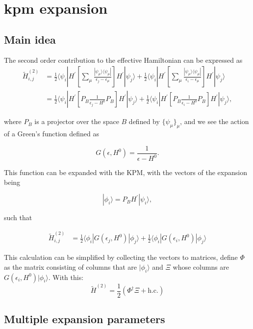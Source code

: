 \documentclass[10pt, onecolumn, aps, prb, superscriptaddress, floatfix, showpacs, notitlepage]{revtex4-1}
\newcommand{\bra}[1]{\langle #1|}
\newcommand{\ket}[1]{|#1\rangle}
\begin{document}
\section{kpm expansion}

\subsection{Main idea}

The second order contribution to the effective Hamiltonian can be expressed as
\begin{align}
\tilde{H}^{(2)}_{i,j} &= \frac{1}{2}
\bra{\psi_i} H^{\prime}
\left[
\sum_\mu
\frac{\ket{\psi_\mu} \bra{\psi_\mu}}{\epsilon_j-\epsilon_\mu}
\right]
H^{\prime} \ket{\psi_j}
+
\frac{1}{2}
\bra{\psi_i} H^{\prime}
\left[
\sum_\mu
\frac{\ket{\psi_\mu} \bra{\psi_\mu}}{\epsilon_i-\epsilon_\mu}
\right]
H^{\prime} \ket{\psi_j}
\\
&= \frac{1}{2}
\bra{\psi_i} H^{\prime}
\left[P_B
\frac{1}{\epsilon_j-H^0}
P_B\right]
H^{\prime} \ket{\psi_j}
+
\frac{1}{2}
\bra{\psi_i} H^{\prime}
\left[P_B
\frac{1}{\epsilon_i-H^0}
P_B\right]
H^{\prime} \ket{\psi_j},
\end{align}

where $P_B$ is a projector over the space $B$ defined by $\{\psi_\mu\}_\mu$,
and we see the action of a Green's function defined as

$$
G(\epsilon, H^0) = \frac{1}{\epsilon-H^0}.
$$

This function can be expanded with the KPM, with the vectors of the expansion
being

$$
\ket{\phi_i} = P_B H^{\prime}\ket{\psi_i},
$$


such that


\begin{align}
\tilde{H}^{(2)}_{i,j} &= \frac{1}{2}
\bra{\phi_i} G(\epsilon_j, H^0) \ket{\phi_j}
+
\frac{1}{2}
\bra{\phi_i} G(\epsilon_i, H^0) \ket{\phi_j}
\end{align}

This calculation can be simplified by collecting the vectors to matrices, define $\Phi$ as the matrix consisting of columns that are $\ket{\phi_i}$ and $\Xi$ whose columns are $G(\epsilon_i, H^0) \ket{\phi_i}$. With this:
\begin{equation}
\tilde{H}^{(2)} = \frac{1}{2} (\Phi^\dag \Xi + \text{h.c.})
\end{equation}

\subsection{Multiple expansion parameters}
\end{document}
